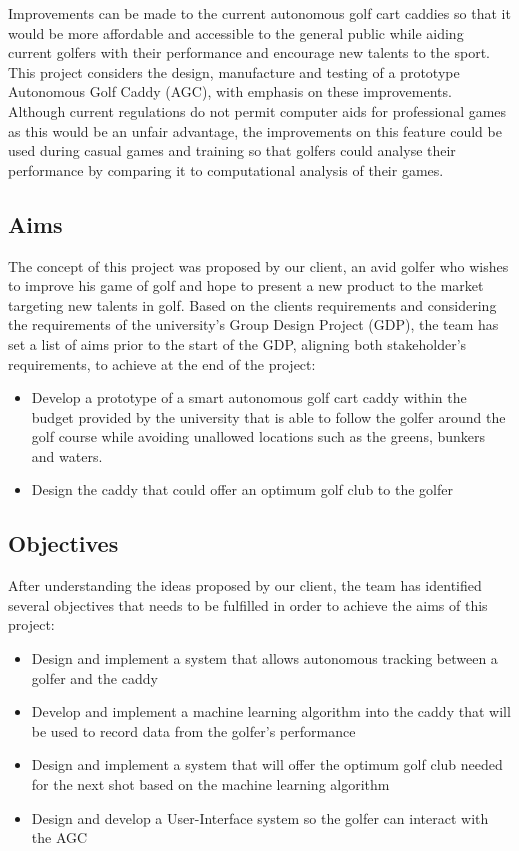 \documentclass[11pt,landscape]{article}
\begin{document}
\begin{multicols}{2}
Improvements can be made to the current autonomous golf cart caddies so that
it would be more affordable and accessible to the general public while aiding
current golfers with their performance and encourage new talents to the sport. This
project considers the design, manufacture and testing of a prototype Autonomous
Golf Caddy (AGC), with emphasis on these improvements. Although current
regulations do not permit computer aids for professional games as this would be
an unfair advantage, the improvements on this feature could be used
during casual games and training so that golfers could analyse their performance
by comparing it to computational analysis of their games.  

\subsection{Aims}
The concept of this project was proposed by our client, an avid golfer who wishes
to improve his game of golf and hope to present a new product to the market
targeting new talents in golf. Based on the clients requirements and considering
the requirements of the university's Group Design Project (GDP), the team has set
a list of aims prior to the start of the GDP, aligning both stakeholder's
requirements, to achieve at the end of the project: 
\begin{itemize}
    \item Develop a prototype of a smart autonomous golf cart caddy within the budget
    provided by the university that is able to follow the golfer around the golf
    course while avoiding unallowed locations such as the greens, bunkers and
    waters. 
    \item Design the caddy that could offer an optimum golf club to the golfer
\end{itemize}
\vfill\null
\columnbreak

\subsection{Objectives}
After understanding the ideas proposed by our client, the team has identified
several objectives that needs to be fulfilled in order to achieve the aims of
this project: 
\begin{itemize}
    \item Design and implement a system that allows autonomous tracking between
    a golfer and the caddy 
    \item Develop and implement a machine learning algorithm into the caddy that
    will be used to record data from the golfer’s performance 
    \item Design and implement a system that will offer the optimum golf club
    needed for the next shot based on the machine learning algorithm 
    \item Design and develop a User-Interface system so the golfer can interact
    with the AGC
\end{itemize}


\end{multicols}
\end{document}
